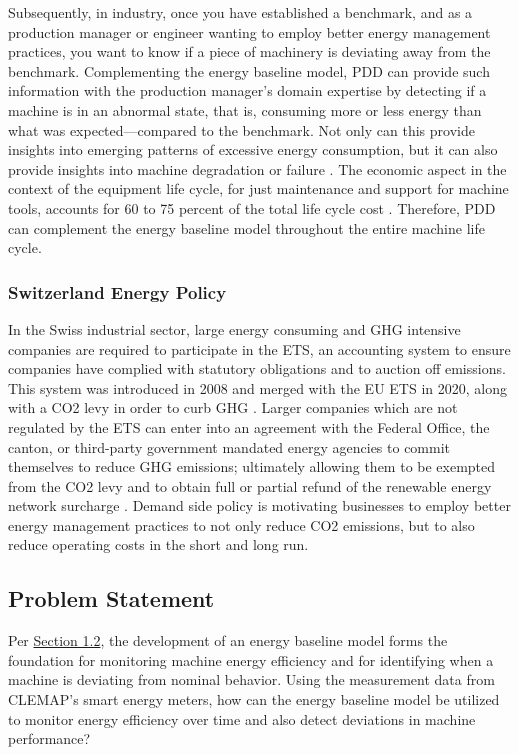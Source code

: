 Subsequently, in industry, once you have established a benchmark, and as a production manager or engineer wanting to employ better energy management practices, you want to know if a piece of machinery is deviating away from the benchmark. Complementing the energy baseline model, \ac{PDD} can provide such information with the production manager's domain expertise by detecting if a machine is in an abnormal state, that is, consuming more or less energy than what was expected—compared to the benchmark. Not only can this provide insights into emerging patterns of excessive energy consumption, but it can also provide insights into machine degradation or failure \cite{online-fault-monitoring}. The economic aspect in the context of the equipment life cycle, for just maintenance and support for machine tools, accounts for 60 to 75 percent of the total life cycle cost \cite{econ-costs}. Therefore, PDD can complement the energy baseline model throughout the entire machine life cycle.

\subsubsection{Switzerland Energy Policy}
In the Swiss industrial sector, large energy consuming and \ac{GHG} intensive companies are required to participate in the \ac{ETS}, an accounting system to ensure companies have complied with statutory obligations and to auction off emissions. This system was introduced in 2008 and merged with the \ac{EU} ETS in 2020, along with a \ac{CO2} levy in order to curb GHG \cite{carbon_trading}. Larger companies which are not regulated by the ETS can enter into an agreement with the Federal Office, the canton, or third-party government mandated energy agencies to commit themselves to reduce GHG emissions; ultimately allowing them to be exempted from the CO2 levy and to obtain full or partial refund of the renewable energy network surcharge \cite{optional}. Demand side policy is motivating businesses to employ better energy management practices to not only reduce CO2 emissions, but to also reduce operating costs in the short and long run. 

\subsection{Problem Statement}

Per \hyperlink{subsection.1.2}{Section 1.2}, the development of an energy baseline model forms the foundation for monitoring machine energy efficiency and for identifying when a machine is deviating from nominal behavior. Using the measurement data from CLEMAP's smart energy meters, how can the energy baseline model be utilized to monitor energy efficiency over time and also detect deviations in machine performance?

